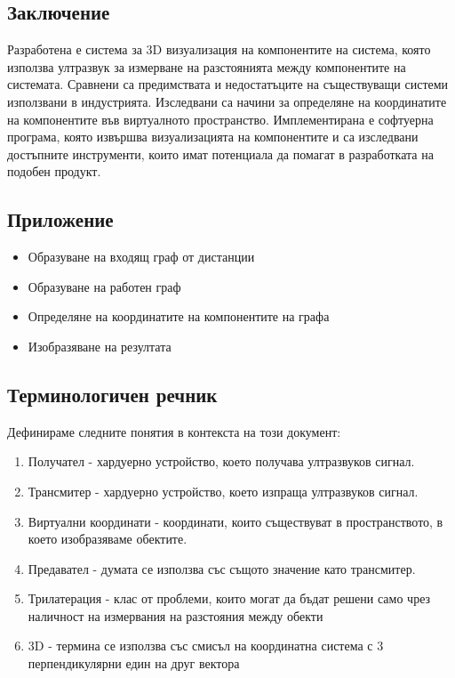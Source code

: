 \subsection{Заключение}
Разработена е система за 3D визуализация на компонентите на система, която използва ултразвук за измерване на разстоянията между компонентите на системата. Сравнени са предимствата и недостатъците на съществуващи системи използвани в индустрията. Изследвани са начини за определяне на координатите на компонентите във виртуалното пространство. Имплементирана е софтуерна програма, която извършва визуализацията на компонентите и са изследвани достъпните инструменти, които имат потенциала да помагат в разработката на подобен продукт.

\subsection{Приложение}

\begin{itemize}
    \item Образуване на входящ граф от дистанции
    \item Образуване на работен граф
    \item Определяне на координатите на компонентите на графа
    \item Изобразяване на резултата
\end{itemize}

\subsection{Терминологичен речник}
Дефинираме следните понятия в контекста на този документ:
\begin{enumerate}
    \item Получател - хардуерно устройство, което получава ултразвуков сигнал.
    \item Трансмитер - хардуерно устройство, което изпраща ултразвуков сигнал.
    \item Виртуални координати - координати, които съществуват в пространството, в което изобразяваме обектите.
    \item Предавател - думата се използва със същото значение като трансмитер.
    \item Трилатерация - клас от проблеми, които могат да бъдат решени само чрез наличност на измервания на разстояния между обекти \cite{murphy}
    \item 3D - термина се използва със смисъл на координатна система с 3 перпендикулярни един на друг вектора
\end{enumerate}